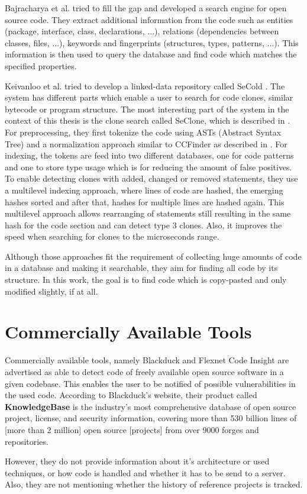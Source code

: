 Bajracharya et al. tried to fill the gap and developed a search engine for open source code.
They extract additional information from the code such as entities (package, interface, class, declarations, ...), relations (dependencies between classes, files, ...), keywords and fingerprints (structures, types, patterns, ...).
This information is then used to query the database and find code which matches the specified properties.

Keivanloo et al. tried to develop a linked-data repository called SeCold \cite{keivanloo2012leveraging,keivanloo2011internet,keivanloo2011seclone,keivanloo2010semantic}.
The system has different parts which enable a user to search for code clones, similar bytecode or program structure.
The most interesting part of the system in the context of this thesis is the clone search called SeClone, which is described in \cite{keivanloo2011internet,keivanloo2011seclone}.
For preprocessing, they first tokenize the code using ASTs (Abstract Syntax Tree) and a normalization approach similar to CCFinder as described in \cite{kamiya2002ccfinder}.
For indexing, the tokens are feed into two different databases, one for code patterns and one to store type usage which is for reducing the amount of false positives.
To enable detecting clones with added, changed or removed statements, they use a multilevel indexing approach, where lines of code are hashed, the emerging hashes sorted and after that, hashes for multiple lines are hashed again.
This multilevel approach allows rearranging of statements still resulting in the same hash for the code section and can detect type 3 clones.
Also, it improves the speed when searching for clones to the microseconds range.

Although those approaches fit the requirement of collecting huge amounts of code in a database and making it searchable, they aim for finding all code by its structure.
In this work, the goal is to find code which is copy-pasted and only modified slightly, if at all.

\section{Commercially Available Tools}
Commercially available tools, namely Blackduck and Flexnet Code Insight are advertised as able to detect code of freely available open source software in a given codebase.
This enables the user to be notified of possible vulnerabilities in the used code.
According to Blackduck's website, their product called \textbf{KnowledgeBase} \glqq is the industry’s most comprehensive database of open source project, license, and security information, covering more than 530 billion lines of [more than 2 million] open source [projects] from over 9000 forges and repositories\grqq \cite{blackduck}.

However, they do not provide information about it's architecture or used techniques, or how code is handled and whether it has to be send to a server.
Also, they are not mentioning whether the history of reference projects is tracked.